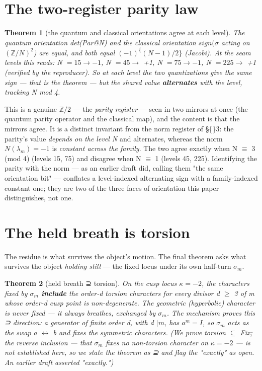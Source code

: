 \documentclass[11pt]{article}
\theoremstyle{plain}
\newtheorem{theorem}{Theorem}[section]
\theoremstyle{definition}
\theoremstyle{remark}
\begin{document}
\section{The two-register parity law}

\begin{theorem}[the quantum and classical orientations agree at each level]
The quantum orientation det(Par@N) and the classical orientation \(sign(\sigma \) acting on \((\mathbb{Z}/N)^{2}\)) are equal, and both equal \((-1)^\{(N-1)/2\}\) (Jacobi). At the seam levels this reads: N \(= 15 \to  -1\), N \(= 45 \to \) +1, N \(= 75 \to  -1\), N \(= 225 \to \) +1 (verified by the reproducer). So at \emph{each} level the two quantizations give the \emph{same} sign — that is the theorem — but the shared value \textbf{alternates} with the level, tracking N mod 4.
\end{theorem}

This is a genuine \(\mathbb{Z}/2\) — the \emph{parity register} — seen in two mirrors at once (the quantum parity operator and the classical map), and the content is that the mirrors agree. It is a distinct invariant from the norm register of \S\{\}3: the parity's value \emph{depends on the level N} and alternates, whereas the norm \(N(\lambda _{m}) = -1\) is \emph{constant across the family}. The two agree exactly when N \(\equiv \) 3 (mod 4) (levels 15, 75) and disagree when N \(\equiv \) 1 (levels 45, 225). Identifying the parity with the norm — as an earlier draft did, calling them "the same orientation bit" — conflates a level-indexed alternating sign with a family-indexed constant one; they are two of the three faces of orientation this paper distinguishes, not one.

\section{The held breath is torsion}

The residue is what survives the object's motion. The final theorem asks what survives the object \emph{holding still} — the fixed locus under its own half-turn \(\sigma _{m}\).

\begin{theorem}[held breath ⊇ torsion]
On the cusp locus \(\kappa  = -2\), the characters fixed by \(\sigma _{m}\) \textbf{include} the order-d torsion characters for every divisor d \(\ge \) 3 of m \emph{whose order-d cusp point is non-degenerate}. The geometric (hyperbolic) character is never fixed — it always breathes, exchanged by \(\sigma _{m}\). The mechanism proves this ⊇ direction: a generator of finite order d, with d \(| m\), has \(a^{m} = I\), so \(\sigma _{m}\) acts as the swap a \(\leftrightarrow \) b and fixes the symmetric characters. (We prove torsion \(\subseteq \) Fix; the reverse inclusion — that \(\sigma _{m}\) fixes \emph{no} non-torsion character on \(\kappa  = -2\) — is not established here, so we state the theorem as ⊇ and flag the "exactly" as open. An earlier draft asserted "exactly.")
\end{theorem}
\end{document}
